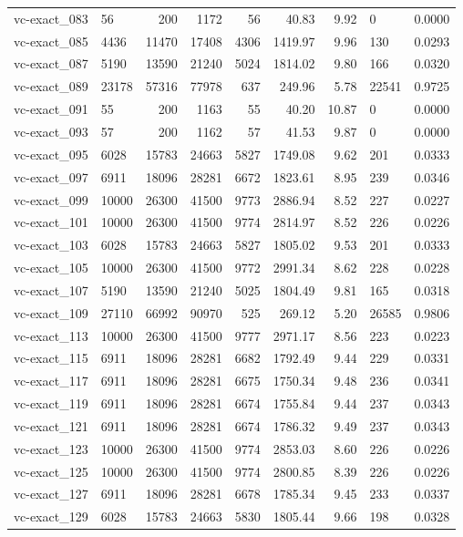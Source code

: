 \begin{longtable}{llrrrrrll}
vc-exact\_083 & 56 & 200 & 1172 & 56 & 40.83 & 9.92 & 0 & 0.0000 \\
vc-exact\_085 & 4436 & 11470 & 17408 & 4306 & 1419.97 & 9.96 & 130 & 0.0293 \\
vc-exact\_087 & 5190 & 13590 & 21240 & 5024 & 1814.02 & 9.80 & 166 & 0.0320 \\
vc-exact\_089 & 23178 & 57316 & 77978 & 637 & 249.96 & 5.78 & 22541 & 0.9725 \\
vc-exact\_091 & 55 & 200 & 1163 & 55 & 40.20 & 10.87 & 0 & 0.0000 \\
vc-exact\_093 & 57 & 200 & 1162 & 57 & 41.53 & 9.87 & 0 & 0.0000 \\
vc-exact\_095 & 6028 & 15783 & 24663 & 5827 & 1749.08 & 9.62 & 201 & 0.0333 \\
vc-exact\_097 & 6911 & 18096 & 28281 & 6672 & 1823.61 & 8.95 & 239 & 0.0346 \\
vc-exact\_099 & 10000 & 26300 & 41500 & 9773 & 2886.94 & 8.52 & 227 & 0.0227 \\
vc-exact\_101 & 10000 & 26300 & 41500 & 9774 & 2814.97 & 8.52 & 226 & 0.0226 \\
vc-exact\_103 & 6028 & 15783 & 24663 & 5827 & 1805.02 & 9.53 & 201 & 0.0333 \\
vc-exact\_105 & 10000 & 26300 & 41500 & 9772 & 2991.34 & 8.62 & 228 & 0.0228 \\
vc-exact\_107 & 5190 & 13590 & 21240 & 5025 & 1804.49 & 9.81 & 165 & 0.0318 \\
vc-exact\_109 & 27110 & 66992 & 90970 & 525 & 269.12 & 5.20 & 26585 & 0.9806 \\
vc-exact\_113 & 10000 & 26300 & 41500 & 9777 & 2971.17 & 8.56 & 223 & 0.0223 \\
vc-exact\_115 & 6911 & 18096 & 28281 & 6682 & 1792.49 & 9.44 & 229 & 0.0331 \\
vc-exact\_117 & 6911 & 18096 & 28281 & 6675 & 1750.34 & 9.48 & 236 & 0.0341 \\
vc-exact\_119 & 6911 & 18096 & 28281 & 6674 & 1755.84 & 9.44 & 237 & 0.0343 \\
vc-exact\_121 & 6911 & 18096 & 28281 & 6674 & 1786.32 & 9.49 & 237 & 0.0343 \\
vc-exact\_123 & 10000 & 26300 & 41500 & 9774 & 2853.03 & 8.60 & 226 & 0.0226 \\
vc-exact\_125 & 10000 & 26300 & 41500 & 9774 & 2800.85 & 8.39 & 226 & 0.0226 \\
vc-exact\_127 & 6911 & 18096 & 28281 & 6678 & 1785.34 & 9.45 & 233 & 0.0337 \\
vc-exact\_129 & 6028 & 15783 & 24663 & 5830 & 1805.44 & 9.66 & 198 & 0.0328 \\

\end{longtable}
